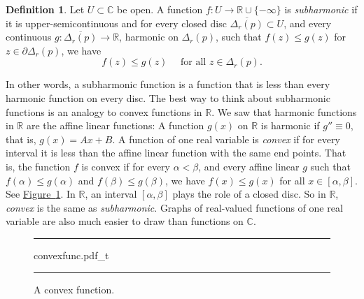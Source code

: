 \documentclass[12pt,openany]{book}
\newcommand{\C}{{\mathbb{C}}}
\newcommand{\R}{{\mathbb{R}}}
\newcommand{\myindex}[1]{#1\index{#1}}
\theoremstyle{plain}
\theoremstyle{remark}
\theoremstyle{definition}
\newtheorem{defn}[thm]{Definition}
\newenvironment{myfig}{%
\begin{figure}[h!t]
\noindent\rule{\textwidth}{0.5pt}\vspace{12pt}\par\centering}%
{\par\noindent\rule{\textwidth}{0.5pt}
\end{figure}}
\theoremstyle{exercise}
\theoremstyle{example}
\newcommand{\figureref}[1]{\hyperref[#1]{Figure~\ref*{#1}}}
\begin{document}
\begin{defn}
Let $U \subset \C$ be open.
A function $f \colon U \to \R \cup \{ -\infty \}$ is 
\emph{\myindex{subharmonic}} if it is upper-semicontinuous
and for every closed disc $\overline{\Delta_r(p)} \subset U$,
and every continuous $g \colon \overline{\Delta_r(p)} \to \R$,
harmonic on $\Delta_r(p)$,
such that $f(z) \leq g(z)$ for $z \in \partial \Delta_r(p)$, we have
\begin{equation*}
f(z) \leq g(z) \quad \text{ for all } z \in \Delta_r(p) .
\end{equation*}
\end{defn}

In other words, a subharmonic function is a function that is less than every
harmonic function on every disc.
The best way to think about subharmonic functions is an analogy to convex
functions in $\R$.
We saw that harmonic functions in $\R$ are the affine linear functions:
A function $g(x)$ on $\R$ is harmonic if $g'' \equiv 0$, that is, $g(x) = Ax+B$.
A function of one real variable is
\emph{convex} if 
for every interval it is less than the affine linear function with the same
end points.
That is,
the function $f$ is convex if for every $\alpha < \beta$,
and every affine linear $g$ such that
$f(\alpha) \leq g(\alpha)$
and
$f(\beta) \leq g(\beta)$,
we have
$f(x) \leq g(x)$ for all $x \in [\alpha,\beta]$.
See \figureref{fig:convexfunc}.
In $\R$, an interval $[\alpha,\beta]$ plays the role of a closed disc.
So in $\R$, \emph{convex} is the same as \emph{subharmonic}.
Graphs of real-valued functions of one real variable
are also much easier to draw than functions on $\C$.

\begin{myfig}
{convexfunc.pdf_t}
\caption{A convex function.\label{fig:convexfunc}}
\end{myfig}
\end{document}
